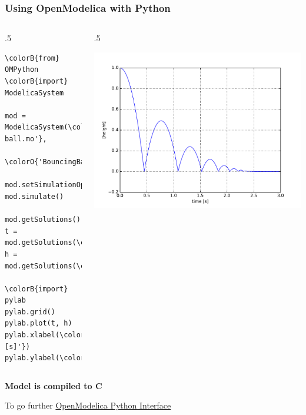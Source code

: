 \begin{frame}[fragile]
  \frametitle{Using OpenModelica with Python}
  \begin{columns}[T]
    \begin{column}{.5\textwidth}
      \fontsize{9pt}{9pt}\selectfont
\begin{Verbatim}[commandchars=\\\{\}]
\colorB{from} OMPython \colorB{import} ModelicaSystem

mod = ModelicaSystem(\colorO{'bouncing-ball.mo'},
                     \colorO{'BouncingBall'})

mod.setSimulationOptions(stopTime=3)
mod.simulate()

mod.getSolutions()
t = mod.getSolutions(\colorO{'time'})
h = mod.getSolutions(\colorO{'h'})

\colorB{import} pylab
pylab.grid()
pylab.plot(t, h)
pylab.xlabel(\colorO{'time [s]'})
pylab.ylabel(\colorO{'[height]'})
\end{Verbatim}
      \normalsize
    \end{column}
    \begin{column}{.5\textwidth}
      \begin{center}
        \includegraphics[width=1.\textwidth]{figures/bouncing-ball-height.pdf}
      \end{center}
    \end{column}
  \end{columns}
  \vspace{.5em}
  \centerline{\textbf{Model is compiled to C}}
  \begin{flushright}
    \tiny%
    To go further
    \href{https://www.openmodelica.org/doc/OpenModelicaUsersGuide/latest/ompython.html}{OpenModelica Python Interface}
  \end{flushright}
\end{frame}

